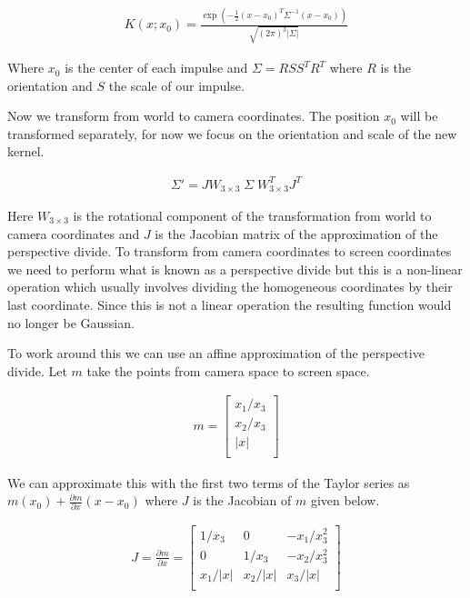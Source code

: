 \documentclass{article}
\begin{document}
\begin{align}
K(x;x_0) = \frac{\exp\left({-\frac{1}{2}(x-x_0)^T\Sigma^{-1}(x-x_0)}\right)}{\sqrt{(2\pi)^3|\Sigma|}}
\end{align}

Where $x_0$ is the center of each impulse and $\Sigma=RSS^TR^T$ where $R$ is the orientation and $S$ the scale of our impulse.

Now we transform from world to camera coordinates. The position $x_0$ will be transformed separately, for now we focus on the orientation and scale of the new kernel.

\begin{align}
\Sigma' = JW_{3\times 3} \; \Sigma \; W_{3\times 3}^TJ^T
\end{align}

Here $W_{3\times 3}$ is the rotational component of the transformation from world to camera coordinates and $J$ is the Jacobian matrix of the approximation of the perspective divide. To transform from camera coordinates to screen coordinates we need to perform what is known as a perspective divide but this is a non-linear operation which usually involves dividing the homogeneous coordinates by their last coordinate. Since this is not a linear operation the resulting function would no longer be Gaussian.

To work around this we can use an affine approximation of the perspective divide. Let $m$ take the points from camera space to screen space.

\begin{align}
m = \left[
\begin{array}{ccc}
x_1/x_3 \\
x_2/x_3 \\
|x| \\
\end{array}
\right]
\end{align}

We can approximate this with the first two terms of the Taylor series as $m(x_0)+\frac{\partial m}{\partial x}(x-x_0)$ where $J$ is the Jacobian of $m$ given below.

\begin{align}
J = \frac{\partial m}{\partial x} = \left[
\begin{array}{ccc}
    1/x_3   &        0 &  -x_1/x_3^2 \\
    0       &    1/x_3 &  -x_2/x_3^2 \\
    x_1/|x| &  x_2/|x| &   x_3/|x|   \\
\end{array}
\right]
\end{align}
\end{document}
